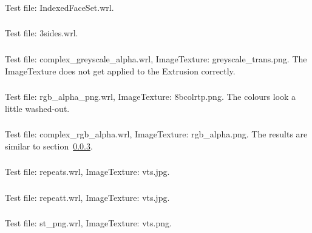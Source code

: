 \subsubsection{\ITG}
\label{sec:jpeg-ifs}
Test file: IndexedFaceSet.wrl.

\subsubsection{\ITHa\ITHb}
Test file: 3sides.wrl.

\setcounter{subsubsection}{21}
\subsubsection{\ITVa\ITVb}
\label{sec:png-complex-greyscale}
Test file: complex\_greyscale\_alpha.wrl, ImageTexture: greyscale\_trans.png.\newline
The ImageTexture does not get applied to the Extrusion correctly.

\subsubsection{\ITWa\ITWb}
Test file: rgb\_alpha\_png.wrl, ImageTexture: 8bcolrtp.png.\newline
The colours look a little washed-out.

\subsubsection{\ITXa\ITXb}
Test file: complex\_rgb\_alpha.wrl, ImageTexture: rgb\_alpha.png.\newline
The results are similar to section~\ref{sec:png-complex-greyscale}.

\setcounter{subsubsection}{29}
\subsubsection{\ITAD}
\label{sec:vert-clamp}
Test file: repeats.wrl, ImageTexture: vts.jpg.

\subsubsection{\ITAE}
Test file: repeatt.wrl, ImageTexture: vts.jpg.

\subsubsection{\ITAF}
Test file: st\_png.wrl, ImageTexture: vts.png.


